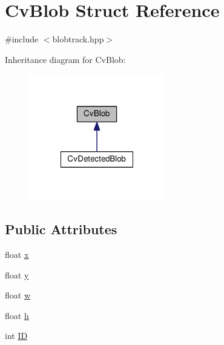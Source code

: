 \hypertarget{structCvBlob}{\section{Cv\-Blob Struct Reference}
\label{structCvBlob}
}


{\ttfamily \#include $<$blobtrack.\-hpp$>$}



Inheritance diagram for Cv\-Blob\-:\nopagebreak
\begin{figure}[H]
\begin{center}
\leavevmode
\includegraphics[width=168pt]{structCvBlob__inherit__graph}
\end{center}
\end{figure}
\subsection*{Public Attributes}
\begin{DoxyCompactItemize}
\item 
float \hyperlink{structCvBlob_a1a485b2d61f71da5aa10d905a1de8214}{x}
\item 
float \hyperlink{structCvBlob_a91c35a2520d1596140c47c51a3a5ae17}{y}
\item 
float \hyperlink{structCvBlob_ab54077d5cb25eda9c933f985aef9fe2e}{w}
\item 
float \hyperlink{structCvBlob_a9804e5eccb3e2db67fd953e9448c92ab}{h}
\item 
int \hyperlink{structCvBlob_a16df7a5bab3b565d73b4dd6dea7f0bbc}{I\-D}
\end{DoxyCompactItemize}


